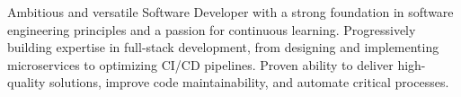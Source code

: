 

\begin{cvparagraph}

Ambitious and versatile Software Developer with a strong foundation in software engineering principles and a passion for continuous learning. Progressively building expertise in full-stack development, from designing and implementing microservices to optimizing CI/CD pipelines. Proven ability to deliver high-quality solutions, improve code maintainability, and automate critical processes.
\end{cvparagraph}
